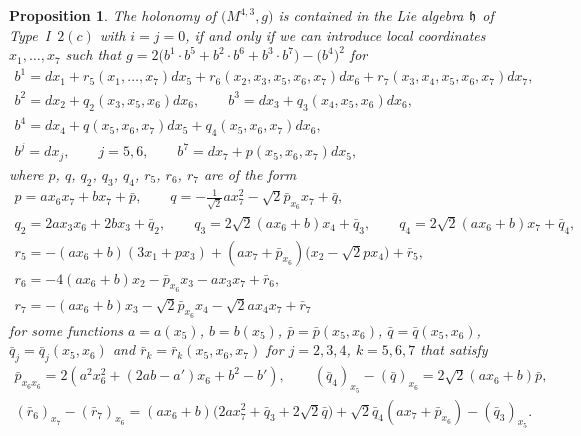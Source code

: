 \documentclass[11pt]{article}
\numberwithin{equation}{section}
\newtheorem{Proposition}[Theorem]{Proposition}
 { \theoremstyle{definition}
\newtheorem{Definition}[Theorem]{Definition}
\newtheorem{Example}[Theorem]{Example}
\newtheorem{Remark}[Theorem]{Remark} }
\newcommand\fh{{\frak h}}
\begin{document}
\begin{Proposition} \label{P36} The holonomy of $\big(M^{4,3},g\big)$ is contained in the Lie algebra $\fh$ of Type~I~$2(c)$ with $i=j=0$, if and only if we can introduce local coordinates $x_1,\dots,x_7$ such that $g=2\big(b^1\cdot b^5+b^2\cdot b^6+b^3\cdot b^7\big)- \big(b^4\big)^2$ for
\begin{gather*}
b^1= dx_1 + r_5(x_1,\dots, x_7)dx_5+r_6(x_2,x_3,x_5,x_6,x_7)dx_6+r_7(x_3,x_4,x_5,x_6,x_7)dx_7, \\
b^2= dx_2+q_2(x_3,x_5,x_6)dx_6, \qquad b^3= dx_3+q_3(x_4,x_5,x_6) dx_6, \\
b^4= dx_4+ q(x_5,x_6,x_7)dx_5+q_4(x_5,x_6,x_7)dx_6, \\
b^j= dx_j,\qquad j=5,6, \qquad
b^7= dx_7 +p(x_5,x_6,x_7)dx_5,
\end{gather*}
where $p$, $q$, $q_2$, $q_3$, $q_4$, $r_5$, $r_6$, $r_7$ are of the form
\begin{gather*}
p = ax_6x_7+bx_7+\bar p,\qquad
q = -\tfrac1{\sqrt 2} ax_7^2 -\sqrt 2 \bar p_{x_6}x_7+\bar q, \\
q_2 = 2ax_3x_6 +2bx_3+\bar q_2,\qquad
q_3= 2\sqrt 2 (ax_6+b) x_4+\bar q_3, \qquad
q_4 = 2\sqrt 2 (ax_6+b) x_7+\bar q_4, \\
r_5=-(ax_6+b)(3x_1+px_3)+(ax_7+\bar p_{x_6})\big(x_2-\sqrt2 px_4\big)+\bar r_5, \\
r_6=-4(ax_6+b)x_2-\bar p_{x_6}x_3-ax_3x_7+\bar r_6, \\
r_7=-(ax_6+b)x_3-\sqrt2 \bar p_{x_6}x_4-\sqrt2 ax_4 x_7+\bar r_7
\end{gather*}
for some functions $a=a(x_5)$, $b=b(x_5)$, $\bar p=\bar p(x_5,x_6)$, $\bar q=\bar q(x_5,x_6)$, $\bar q_j=\bar q_j(x_5,x_6)$ and $\bar r_k=\bar r_k(x_5,x_6,x_7)$ for $j=2,3,4$, $k=5,6,7$ that satisfy
\begin{gather*}
\bar p_{x_6 x_6}=2(a^2x_6^2+(2ab-a')x_6+b^2-b'), \qquad
(\bar q_4)_{x_5}-(\bar q)_{x_6}=2\sqrt 2(ax_6+b)\bar p,\\
(\bar r_6)_{x_7}-(\bar r_7)_{x_6}=(ax_6+b)\big(2ax_7^2+\bar q_3+2\sqrt2 \bar q\big)+\sqrt2 \bar q_4(ax_7+\bar p_{x_6} )-(\bar q_3)_{x_5}.
\end{gather*}
\end{Proposition}
\end{document}
